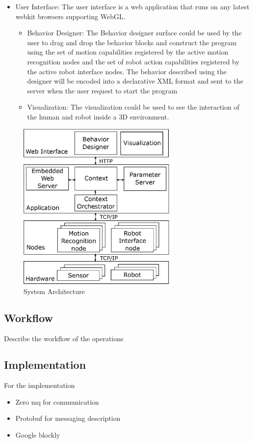 \documentclass{llncs}
\begin{document}
\begin{itemize}
\begin{itemize}
\end{itemize}
\item User Interface: The user interface is a web application that runs on any latest webkit browsers supporting WebGL. 
\begin{itemize}
\item Behavior Designer: The Behavior designer surface could be used by the user to drag and drop the behavior blocks and construct the program using the set of motion capabilities registered by the active motion recognition nodes and the set of robot action capabilities registered by the active robot interface nodes. The behavior described using the designer will be encoded into a declarative XML format and sent to the server when the user request to start the program
\item Visualization: The visualization could be used to see the interaction of the human and robot inside a 3D environment.
\end{itemize}
\end{itemize}
\begin{figure}
\centering
\includegraphics[width=0.7\textwidth]{../thesis/assets/architecture.eps}
\caption[System Architecture]{System Architecture}
\label{fig:architecture}
\end{figure}
%
\subsection{Workflow}
%
Describe the workflow of the operations
%
\subsection{Implementation}
%
For the implementation
\begin{itemize}
\item Zero mq for communication
\item Protobuf for messaging description
\item Google blockly
\end{itemize}
%
\end{document}
